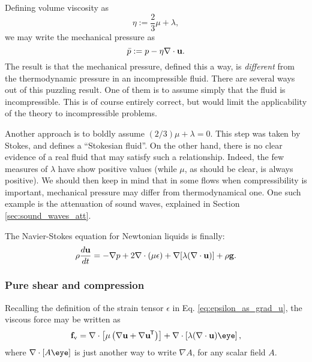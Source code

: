Defining volume viscosity as
\begin{equation}
  \label{eq:vol_visc_definition}
  \eta:=\frac23 \mu  + \lambda,
\end{equation}
we may write the mechanical pressure as
\begin{equation}
  \label{eq:mech_p_definition}
  \bar{p} :=
  p - \eta \nabla\cdot \mathbf{u} .
\end{equation}
%
The result is that the mechanical pressure, defined this a way, is
\emph{different} from the thermodynamic pressure in an incompressible
fluid.  There are several ways out of this puzzling result. One of
them is to assume simply that the fluid is incompressible. This is of
course entirely correct, but would limit the applicability of the
theory to incompressible problems.

Another approach is to boldly assume $( 2/3 ) \mu+\lambda=0$. This
step was taken by Stokes, and defines a ``Stokesian fluid''. On the
other hand, there is no clear evidence of a real fluid that may
satisfy such a relationship. Indeed, the few measures of $\lambda$
have show positive values (while $\mu$, as should be clear, is always
positive). We should then keep in mind that in some flows when
compressibility is important, mechanical pressure may differ from
thermodynamical one. One such example is the attenuation of sound
waves, explained in Section \ref{sec:sound_waves_att}.

The Navier-Stokes equation for Newtonian liquids is finally:
\begin{equation}
  \label{eq:NS_Newtonian}
  \rho \frac{d\mathbf{u} }{dt} =
  - \nabla p +
  2 \nabla \cdot ( \mu \epsilon)
  + \nabla [ \lambda ( \nabla\cdot\mathbf{u} ) ]
  + \rho \mathbf{g} .
\end{equation}



\subsubsection{Pure shear and compression}

Recalling the definition of the strain tensor $\epsilon$
in Eq. \ref{eq:epsilon_as_grad_u}, the viscous force may be written as
\begin{equation*}
  \bff_\mathrm{v}=
  \nabla \cdot \left[ \mu  \left( \nabla\bfu + \nabla\bfu\tran \right) \right] +
  \nabla \cdot \left[ \lambda (\divu) \eye \right] ,
\end{equation*}
where $\nabla \cdot \left[ A \eye \right] $ is just another way to
write $\nabla A$, for any scalar field $A$.


